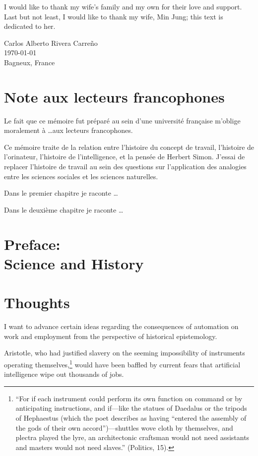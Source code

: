 \documentclass[version=last,draft=true,paper=A4,portrait,twoside=true,twocolumn=false,headinclude=false,footinclude=false,fontsize=12,BCOR=20mm,DIV=calc,pagesize=auto,titlepage=firstiscover,mpinclude=true,open=right,chapterprefix=true,numbers=autoendperiod,headsepline=false,headings=twolinechapter,parskip=false]{scrbook}
\begin{document}
I would like to thank my wife's family and my own for their love and
support. Last but not least, I would like to thank my wife, Min Jung; this
text is dedicated to her.

\vspace{2\baselineskip}
\begin{FlushRight}
  Carlos Alberto Rivera Carreño\\
  \today\\
  Bagneux, France
\end{FlushRight}



\chapter{Note aux lecteurs francophones} 
Le fait que ce mémoire fut préparé au sein d'une université française
m'oblige moralement à \ldots aux lecteurs francophones. 

Ce mémoire traite de la relation entre l'histoire du concept de travail,
l'histoire de l'orinateur, l'histoire de l'intelligence, et la pensée de
Herbert Simon. J'essai de replacer l'histoire de travail au sein des
questions sur  l'application des analogies entre les sciences sociales et
les sciences naturelles.  

Dans le premier chapitre je raconte \ldots 

Dans le deuxième chapitre je raconte \ldots 

\lipsum

\chapter[Preface]{Preface:\\ Science and History} 

\lipsum
\mainmatter
\pagestyle{scrheadings}
\chapter{Thoughts}
\label{sec:org72b9502}
I want to advance certain ideas regarding the consequences of automation on
work and employment from the perspective of historical epistemology. 

Aristotle, who had justified slavery on the seeming impossibility of
instruments operating themselves,\footnote{``For if each instrument could perform its own function on command
or by anticipating instructions, and if---like the statues of Daedalus or
the tripods of Hephaestus (which the poet describes as having ``entered the
assembly of the gods of their own accord'')---shuttles wove cloth by
themselves, and plectra played the lyre, an architectonic craftsman would
not need assistants and masters would not need slaves.'' (Politics, 15).} would have been baffled by current
fears that artificial intelligence wipe out thousands of jobs. 
\end{document}
